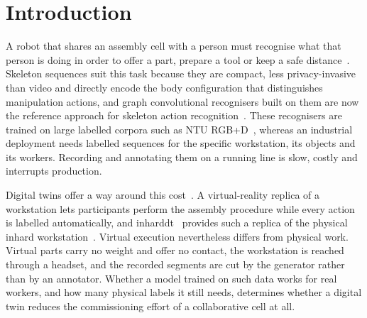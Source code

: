 \documentclass[3p,times,procedia]{elsarticle}
\begin{document}
\section{Introduction}
\label{sec:introduction}

A robot that shares an assembly cell with a person must recognise what that
person is doing in order to offer a part, prepare a tool or keep a safe
distance~\cite{wang2018hrcmotion}. Skeleton sequences suit this task because
they are compact, less privacy-invasive than video and directly encode the body
configuration that distinguishes manipulation actions, and graph convolutional
recognisers built on them are now the reference approach for skeleton action
recognition~\cite{yan2018stgcn,chen2021ctrgcn,liu2025skeletonreview}. These
recognisers are trained on large labelled corpora such as NTU
RGB+D~\cite{shahroudy2016ntu,liu2020ntu120}, whereas an industrial deployment
needs labelled sequences for the specific workstation, its objects and its
workers. Recording and annotating them on a running line is slow, costly and
interrupts production.

Digital twins offer a way around this cost~\cite{tao2019digitaltwin}. A
virtual-reality replica of a workstation lets participants perform the assembly
procedure while every action is labelled automatically, and
\ac{inharddt}~\cite{dallel2023digital} provides such a replica of the physical
\ac{inhard} workstation~\cite{dallel2020inhardpaper}. Virtual execution
nevertheless differs from physical work. Virtual parts carry no weight and
offer no contact, the workstation is reached through a headset, and the
recorded segments are cut by the generator rather than by an annotator. Whether
a model trained on such data works for real workers, and how many physical
labels it still needs, determines whether a digital twin reduces the
commissioning effort of a collaborative cell at all.
\end{document}
